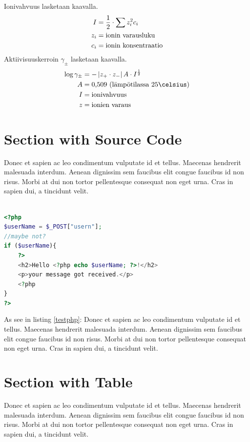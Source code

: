 \documentclass[11pt,a4paper,oneside,article]{memoir}
\begin{document}
Ionivahvuus lasketaan kaavalla.
\begin{align}
I&=\frac{1}{2}\cdot\sum z_i^2c_i \\
z_i&= \textnormal{ionin varausluku} \\
c_i&= \textnormal{ionin konsentraatio}
\end{align}
Aktiivisuuskerroin $\gamma_\pm$ lasketaan kaavalla.
\begin{align}
\log \gamma_\pm &= -\left|z_+\cdot z_-\right|A\cdot I^{\frac{1}{2}} \\
A &= \tn{0,509 (lämpötilassa 25\celsius}) \\
I &= \tn{ionivahvuus} \\
z &= \tn{ionien varaus}
\end{align}

\section{Section with Source Code}
Donec et sapien ac leo condimentum vulputate id et tellus. Maecenas hendrerit malesuada interdum. Aenean dignissim sem faucibus elit congue faucibus id non risus. Morbi at dui non tortor pellentesque consequat non eget urna. Cras in sapien dui, a tincidunt velit.

\vspace{-22pt}\begin{lstlisting}[language=PHP,caption={Descriptive Caption Text},label=testphp] 

<?php
$userName = $_POST["usern"];
//maybe not?
if ($userName){
	?>
	<h2>Hello <?php echo $userName; ?>!</h2>
	<p>your message got received.</p>
	<?php
}
?>
\end{lstlisting}\vspace{-22pt}


As see in listing \ref{testphp}: Donec et sapien ac leo condimentum vulputate id et tellus. Maecenas hendrerit malesuada interdum. Aenean dignissim sem faucibus elit congue faucibus id non risus. Morbi at dui non tortor pellentesque consequat non eget urna. Cras in sapien dui, a tincidunt velit.

\section{Section with Table}
Donec et sapien ac leo condimentum vulputate id et tellus. Maecenas hendrerit malesuada interdum. Aenean dignissim sem faucibus elit congue faucibus id non risus. Morbi at dui non tortor pellentesque consequat non eget urna. Cras in sapien dui, a tincidunt velit.
\end{document}
